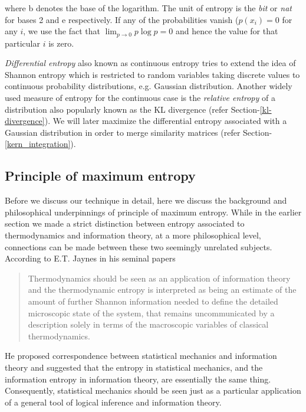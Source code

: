 where b denotes the base of the logarithm. The unit of entropy is the \textit{bit} or \textit{nat} for bases 2 and e respectively. If any of the probabilities vanish ($p(x_i) = 0$ for any $i$, we use the fact that $\lim_{p\to0}p\log p = 0$ and hence the value for that particular $i$ is zero. 

\textit{Differential entropy} also known as continuous entropy tries to extend the idea of Shannon entropy which is restricted to random variables taking discrete values to continuous probability distributions, e.g. Gaussian distribution. Another widely used measure of entropy for the continuous case is the \textit{relative entropy} of a distribution also popularly known as the KL divergence (refer Section-\ref{kl-divergence}). We will later maximize the differential entropy associated with a Gaussian distribution in order to merge similarity matrices (refer Section-\ref{kern_integration}). 


\subsection{Principle of maximum entropy} \label{maxent_principle}
Before we discuss our technique in detail, here we discuss the background and philosophical underpinnings of principle of maximum entropy. While in the earlier section we made a strict distinction between entropy associated to thermodynamics and information theory, at a more philosophical level, connections can be made between these two seemingly unrelated subjects. According to E.T. Jaynes in his seminal papers \citep{jaynes57maxent, jaynes82onrationale} 
\begin{quotation}
Thermodynamics should be seen as an application of information theory and the thermodynamic entropy is interpreted as being an estimate of the amount of further Shannon information needed to define the detailed microscopic state of the system, that remains uncommunicated by a description solely in terms of the macroscopic variables of classical thermodynamics. 
\end{quotation}
He proposed correspondence between statistical mechanics and information theory and suggested that the entropy in statistical mechanics, and the information entropy in information theory, are essentially the same thing. Consequently, statistical mechanics should be seen just as a particular application of a general tool of logical inference and information theory.

